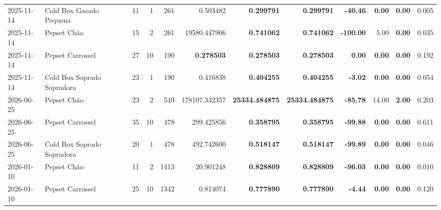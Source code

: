 {\begin{center}
{\begin{tabular}{@{}llrrrrrrrrrr@{}}
2025-11-14 & Cold Box Gasado Pequena & 11 & 1 & 261 & 0.503482 & \textbf{0.299791} & \textbf{0.299791} & \textbf{-40.46} & \textbf{0.00} & \textbf{0.00} & 0.005 \\
2025-11-14 & Pepset Chão & 15 & 2 & 261 & 19580.447906 & \textbf{0.741062} & \textbf{0.741062} & \textbf{-100.00} & 5.00 & \textbf{0.00} & 0.035 \\
2025-11-14 & Pepset Carrossel & 27 & 10 & 190 & \textbf{0.278503} & \textbf{0.278503} & \textbf{0.278503} & \textbf{0.00} & \textbf{0.00} & \textbf{0.00} & 0.192 \\
2025-11-14 & Cold Box Soprado Sopradora & 23 & 1 & 190 & 0.416838 & \textbf{0.404255} & \textbf{0.404255} & \textbf{-3.02} & \textbf{0.00} & \textbf{0.00} & 0.054 \\
2026-06-25 & Pepset Chão & 23 & 2 & 549 & 178107.332357 & \textbf{25334.484875} & \textbf{25334.484875} & \textbf{-85.78} & 14.00 & \textbf{2.00} & 0.203 \\
2026-06-25 & Pepset Carrossel & 35 & 10 & 478 & 299.425856 & \textbf{0.358795} & \textbf{0.358795} & \textbf{-99.88} & \textbf{0.00} & \textbf{0.00} & 0.611 \\
2026-06-25 & Cold Box Soprado Sopradora & 20 & 1 & 478 & 492.742600 & \textbf{0.518147} & \textbf{0.518147} & \textbf{-99.89} & \textbf{0.00} & \textbf{0.00} & 0.046 \\
2026-01-10 & Pepset Chão & 11 & 2 & 1413 & 20.901248 & \textbf{0.828809} & \textbf{0.828809} & \textbf{-96.03} & \textbf{0.00} & \textbf{0.00} & 0.010 \\
2026-01-10 & Pepset Carrossel & 25 & 10 & 1342 & 0.814074 & \textbf{0.777890} & \textbf{0.777890} & \textbf{-4.44} & \textbf{0.00} & \textbf{0.00} & 0.120 \\
\bottomrule
\end{tabular}%
}
\end{center}
}
\vspace*{\fill}
\newpage
\vspace*{\fill}
